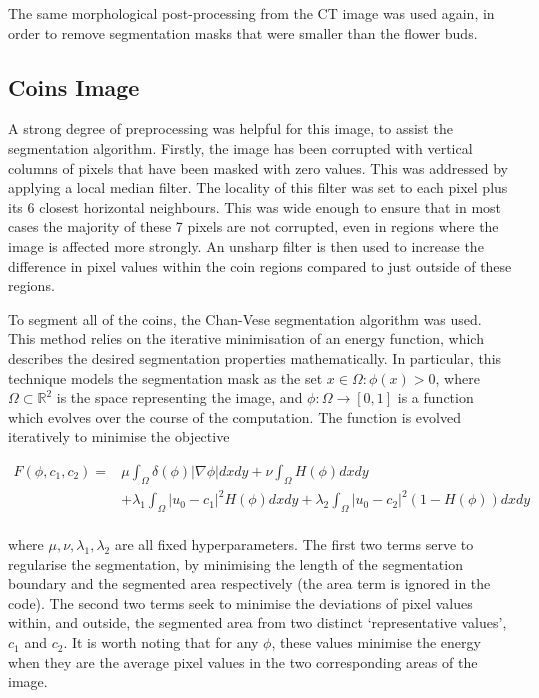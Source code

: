 \documentclass[12pt]{article}
\begin{document}
The same morphological post-processing from the CT image was used again,
in order to remove segmentation masks that were smaller than the flower buds.

\subsection{Coins Image}

A strong degree of preprocessing was helpful for this image, to assist the segmentation algorithm.
Firstly, the image has been corrupted with vertical columns of pixels that have been masked with zero values.
This was addressed by applying a local median filter.
The locality of this filter was set to each pixel plus its 6 closest horizontal neighbours.
This was wide enough to ensure that in most cases the majority of these 7 pixels are not corrupted,
even in regions where the image is affected more strongly.
An unsharp filter is then used to increase the difference in pixel values within the coin regions compared to just outside of these regions.

To segment all of the coins, the Chan-Vese \cite{chanvese} segmentation algorithm was used.
This method relies on the iterative minimisation of an energy function,
which describes the desired segmentation properties mathematically.
In particular, this technique models the segmentation mask as the set ${x\in\Omega:\phi(x)>0}$,
where $\Omega\subset\mathbb{R}^2$ is the space representing the image,
and $\phi:\Omega\rightarrow[0,1]$ is a function which evolves over the course of the computation.
The function is evolved iteratively to minimise the objective

\begin{align*}
    F(\phi, c_1, c_2) = & \mu\int_{\Omega}\delta(\phi)|\nabla\phi|dxdy + \nu\int_{\Omega}H(\phi)dxdy \\
                    & + \lambda_1\int_{\Omega}|u_0-c_1|^2H(\phi)dxdy + \lambda_2\int_{\Omega}|u_0-c_2|^2(1-H(\phi))dxdy \\
\end{align*}

where $\mu,\nu,\lambda_1,\lambda_2$ are all fixed hyperparameters.
The first two terms serve to regularise the segmentation,
by minimising the length of the segmentation boundary and the segmented area respectively (the area term is ignored in the code).
The second two terms seek to minimise the deviations of pixel values within, and outside, the segmented area from two distinct `representative values',
$c_1$ and $c_2$.
It is worth noting that for any $\phi$, these values minimise the energy when they are the average pixel values in the two corresponding areas of the image.
\end{document}
